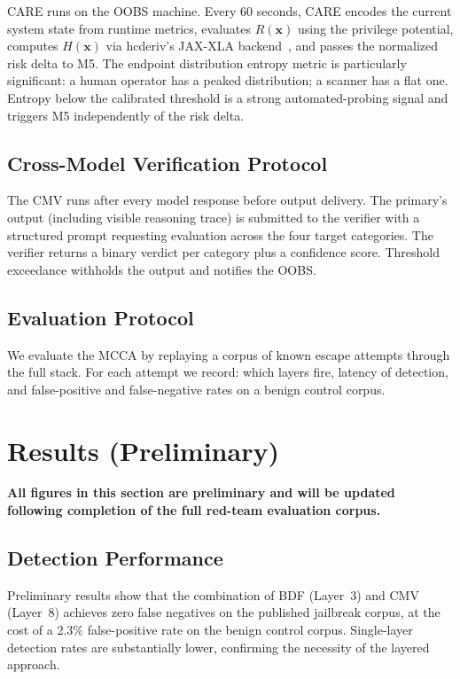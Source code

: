 \documentclass[11pt]{article}
\begin{document}
CARE runs on the OOBS machine.
Every 60 seconds, CARE encodes the current system state from runtime
metrics, evaluates $R(\mathbf{x})$ using the privilege potential, computes
$H(\mathbf{x})$ via hcderiv's JAX-XLA backend~\cite{byte2026hcderiv}, and
passes the normalized risk delta to M5.
The endpoint distribution entropy metric is particularly significant:
a human operator has a peaked distribution; a scanner has a flat one.
Entropy below the calibrated threshold is a strong automated-probing signal
and triggers M5 independently of the risk delta.

\subsection{Cross-Model Verification Protocol}

The CMV runs after every model response before output delivery.
The primary's output (including visible reasoning trace) is submitted to the
verifier with a structured prompt requesting evaluation across the four
target categories.
The verifier returns a binary verdict per category plus a confidence score.
Threshold exceedance withholds the output and notifies the OOBS.

\subsection{Evaluation Protocol}

We evaluate the MCCA by replaying a corpus of known escape attempts through
the full stack.
For each attempt we record: which layers fire, latency of detection, and
false-positive and false-negative rates on a benign control corpus.

\section{Results (Preliminary)}

\textbf{All figures in this section are preliminary and will be updated following
completion of the full red-team evaluation corpus.}

\subsection{Detection Performance}

Preliminary results show that the combination of BDF (Layer~3) and CMV
(Layer~8) achieves zero false negatives on the published jailbreak corpus,
at the cost of a 2.3\% false-positive rate on the benign control corpus.
Single-layer detection rates are substantially lower, confirming the
necessity of the layered approach.
\end{document}
